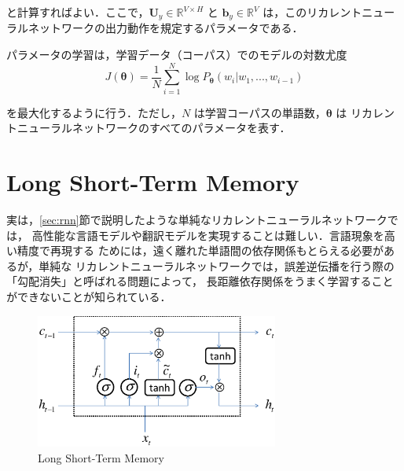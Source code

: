 \noindent
と計算すればよい．ここで，$\boldsymbol{U}_y \in \mathbb{R}^{V \times H}$ と $\boldsymbol{b}_y \in \mathbb{R}^{V}$
は，このリカレントニューラルネットワークの出力動作を規定するパラメータである．



パラメータの学習は，学習データ（コーパス）でのモデルの対数尤度
\begin{equation}
J(\boldsymbol{\theta}) = \frac{1}{N} \sum_{i=1}^{N} \log P_{\boldsymbol{\theta}}(w_i | w_1,...,w_{i-1})
\end{equation}

\noindent
を最大化するように行う．ただし，$N$ は学習コーパスの単語数，$\boldsymbol{\theta}$ は
リカレントニューラルネットワークのすべてのパラメータを表す．




\section{Long Short-Term Memory}

実は，\ref{sec:rnn}節で説明したような単純なリカレントニューラルネットワークでは，
高性能な言語モデルや翻訳モデルを実現することは難しい．言語現象を高い精度で再現する
ためには，遠く離れた単語間の依存関係もとらえる必要があるが，単純な
リカレントニューラルネットワークでは，誤差逆伝播を行う際の「勾配消失」と呼ばれる問題によって，
長距離依存関係をうまく学習することができないことが知られている．

\begin{figure}[t]
 \begin{center}
  \includegraphics[width=80mm]{images/TsuruokaLab/lstm_yt.eps}
 \end{center}
 \caption{Long Short-Term Memory}
 \label{fig:lstm_yt}
\end{figure}

